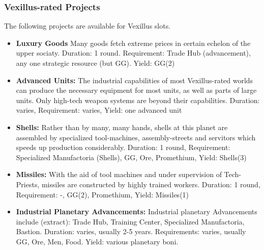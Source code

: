 \subsubsection{Vexillus-rated Projects} 
The following projects are available for Vexillus slots. 
\begin{itemize} 
    \item \textbf{Luxury Goods} Many goods fetch extreme prices in certain echelon of the upper sociaty. Duration: 1 round. Requirement: Trade Hub (advancement), any one strategic resource (but GG). Yield: GG(2)  
    \item \textbf{Advanced Units:} The industrial capabilities of most Vexillus-rated worlds can produce the necessary equipment for most units, as well as parts of large units. Only high-tech weapon systems are beyond their capabilities. Duration: varies, Requirement: varies, Yield: one advanced unit
    \item \textbf{Shells:} Rather than by many, many hands, shells at this planet are assembled by specialized tool-machines, assembly-streets and servitors which speeds up production considerably.  Duration: 1 round, Requirement: Specialized Manufactoria (Shells), GG, Ore, Promethium, Yield: Shells(3)
    \item \textbf{Missiles:} With the aid of tool machines and under supervision of Tech-Priests, missiles are constructed by highly trained workers.  Duration: 1 round, Requirement: -, GG(2), Promethium, Yield: Missiles(1)
    \item \textbf{Industrial Planetary Advancements:} Industrial planetary Advancements include (extract): Trade Hub, Training Center, Specialized Manufactoria, Bastion. Duration: varies, usually 2-5 years. Requirements: varies, usually GG, Ore, Men, Food. Yield: various planetary boni.
\end{itemize} 

